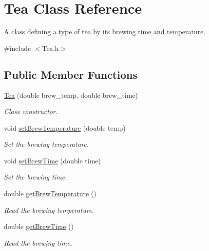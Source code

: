 \hypertarget{classTea}{}\section{Tea Class Reference}
\label{classTea}


A class defining a type of tea by its brewing time and temperature.  




{\ttfamily \#include $<$Tea.\+h$>$}

\subsection*{Public Member Functions}
\begin{DoxyCompactItemize}
\item 
\mbox{\hyperlink{classTea_a0788a36a50457565433259205e916f04}{Tea}} (double brew\+\_\+temp, double brew\+\_\+time)
\begin{DoxyCompactList}\small\item\em Class constructor. \end{DoxyCompactList}\item 
void \mbox{\hyperlink{classTea_acb5bec6356db757e2deb5598b6a7ad37}{set\+Brew\+Temperature}} (double temp)
\begin{DoxyCompactList}\small\item\em Set the brewing temperature. \end{DoxyCompactList}\item 
void \mbox{\hyperlink{classTea_a3f9bb73bd2d9978b63f1dd1a2463f025}{set\+Brew\+Time}} (double time)
\begin{DoxyCompactList}\small\item\em Set the brewing time. \end{DoxyCompactList}\item 
\mbox{\label{classTea_ac4a33558dad77fc196da4eb8ca5ea80b}} 
double \mbox{\hyperlink{classTea_ac4a33558dad77fc196da4eb8ca5ea80b}{get\+Brew\+Temperature}} ()
\begin{DoxyCompactList}\small\item\em Read the brewing temperature. \end{DoxyCompactList}\item 
\mbox{\label{classTea_a9b95d6c5fc91c1bb26a125a8fb8d0e32}} 
double \mbox{\hyperlink{classTea_a9b95d6c5fc91c1bb26a125a8fb8d0e32}{get\+Brew\+Time}} ()
\begin{DoxyCompactList}\small\item\em Read the brewing time. \end{DoxyCompactList}\end{DoxyCompactItemize}



